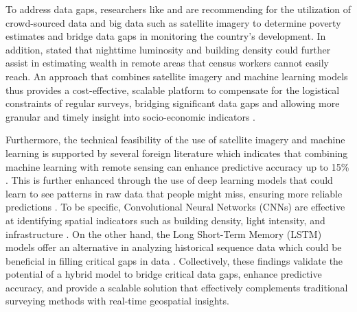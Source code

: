 \documentclass[12pt, letterpaper]{article}
\numberwithin{figure}{section}
\numberwithin{table}{section}
\begin{document}
To address data gaps, researchers like \textcite{Vizmanos2022} and
\textcite{PIDS2020} are recommending for the utilization of
crowd-sourced data and big data such as satellite imagery to
determine  poverty estimates and bridge data gaps in monitoring the
country's development.  In addition, \textcite{Martinez2016} stated
that nighttime luminosity and building density could further assist
in estimating wealth in remote areas that census workers cannot
easily reach. An approach that combines satellite imagery and machine
learning models thus provides a cost-effective, scalable platform to
compensate for the logistical constraints of regular surveys,
bridging significant data gaps and allowing more granular and timely
insight into socio-economic indicators \parencite{Martinez2016,PIDS2020}.

Furthermore, the technical feasibility of the use of satellite
imagery and machine learning is supported by several foreign
literature which indicates that combining machine learning with
remote sensing can enhance predictive accuracy up to 15\%
\parencite{Hall2023,Lamichhane2025}.  This is further enhanced
through the use of deep learning models that could learn to see
patterns in raw data that people might miss, ensuring more reliable
predictions \parencite{LeCun2015}. To be specific, Convolutional
Neural Networks (CNNs) are effective at identifying spatial
indicators such as building density, light intensity,  and
infrastructure \parencite{Yang2022}. On the other hand, the Long
Short-Term Memory (LSTM) models offer an alternative in analyzing
historical sequence data which could be beneficial in filling
critical gaps in data \parencite{Absar2022}. Collectively, these
findings validate the potential of a hybrid model to bridge critical
data gaps, enhance predictive accuracy, and provide a scalable
solution that effectively complements traditional surveying methods
with real-time geospatial insights.
\end{document}
